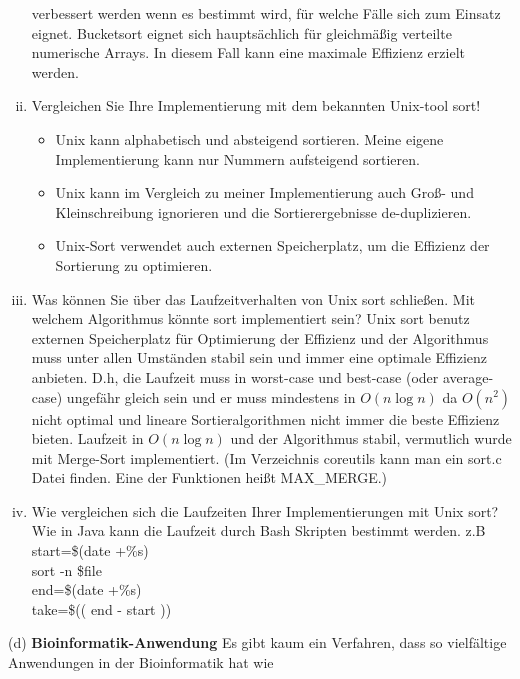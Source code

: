 \documentclass{article}
\begin{document}
\begin{flushleft}
\begin{enumerate}[(i)]
    verbessert werden wenn es bestimmt wird, für welche Fälle sich zum Einsatz eignet. Bucketsort eignet sich 
    hauptsächlich für gleichmäßig verteilte numerische Arrays. In diesem Fall kann eine maximale Effizienz erzielt werden.
    \item Vergleichen Sie Ihre Implementierung mit dem bekannten Unix-tool sort!
    \begin{itemize}
        \item Unix kann alphabetisch und absteigend sortieren. Meine eigene Implementierung kann nur Nummern 
        aufsteigend sortieren.
        \item Unix kann im Vergleich zu meiner Implementierung auch Groß- und Kleinschreibung ignorieren 
        und die Sortierergebnisse de-duplizieren.
        \item Unix-Sort verwendet auch externen Speicherplatz, um die Effizienz der Sortierung zu optimieren.
    \end{itemize}
    \item Was können Sie über das Laufzeitverhalten von Unix sort schließen. Mit welchem Algorithmus könnte sort implementiert sein?
    \newline
    Unix sort benutz externen Speicherplatz für Optimierung der Effizienz und der Algorithmus muss 
    unter allen Umständen stabil sein und immer eine optimale Effizienz anbieten. D.h, die Laufzeit muss in worst-case
    und best-case (oder average-case) ungefähr gleich sein und er muss mindestens in $O(n\log n)$ da $O(n^2)$ nicht optimal 
    und lineare Sortieralgorithmen nicht immer die beste Effizienz bieten.
    Laufzeit in $O(n\log n)$ und der Algorithmus stabil, vermutlich wurde mit Merge-Sort implementiert.
    \newline
    (Im Verzeichnis coreutils kann man ein sort.c Datei finden. Eine der Funktionen heißt MAX\_MERGE.)
    \item Wie vergleichen sich die Laufzeiten Ihrer Implementierungen mit Unix sort?
    \newline
    Wie in Java kann die Laufzeit durch Bash Skripten bestimmt werden.
    z.B \\
        start=\$(date +\%s) \\
        sort -n \$file \\
        end=\$(date +\%s) \\
        take=\$(( end - start ))
\end{enumerate}
(d) \textbf{Bioinformatik-Anwendung}
\newline
Es gibt kaum ein Verfahren, dass so vielfältige Anwendungen in der Bioinformatik hat wie

\end{flushleft}
\end{document}
